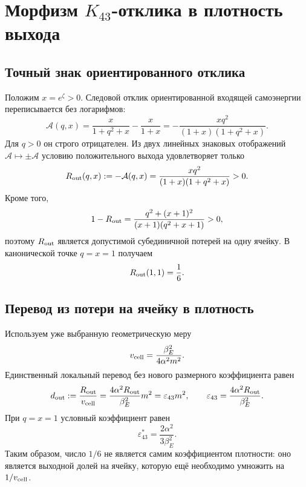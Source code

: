 \chapter{Морфизм \texorpdfstring{$K_{43}$}{K43}-отклика в плотность выхода}
\label{ch:v10-breathing-k43-output-density-morphism}

\section{Точный знак ориентированного отклика}

Положим $x=e^\zeta>0$. Следовой отклик ориентированной входящей
самоэнергии переписывается без логарифмов:
\begin{equation}
 \mathcal A(q,x)
 =\frac{x}{1+q^2+x}-\frac{x}{1+x}
 =-\frac{xq^2}{(1+x)(1+q^2+x)}.
 \label{eq:v10-k43-output-trace-response}
\end{equation}
Для $q>0$ он строго отрицателен. Из двух линейных знаковых отображений
$\mathcal A\mapsto\pm\mathcal A$ условию положительного выхода удовлетворяет
только
\begin{equation}
 R_{\rm out}(q,x):=-\mathcal A(q,x)
 =\frac{xq^2}{(1+x)(1+q^2+x)}>0.
 \label{eq:v10-k43-output-fraction}
\end{equation}
Кроме того,
\begin{equation}
 1-R_{\rm out}
 =\frac{q^2+(x+1)^2}{(x+1)(q^2+x+1)}>0,
 \label{eq:v10-k43-output-subunit}
\end{equation}
поэтому $R_{\rm out}$ является допустимой субединичной потерей на одну
ячейку. В канонической точке $q=x=1$ получаем
\begin{equation}
 R_{\rm out}(1,1)=\frac16.
 \label{eq:v10-k43-output-witness}
\end{equation}

\section{Перевод из потери на ячейку в плотность}

Используем уже выбранную геометрическую меру
\begin{equation}
 v_{\rm cell}=\frac{\beta_E^2}{4\alpha^2m^2}.
\end{equation}
Единственный локальный перевод без нового размерного коэффициента равен
\begin{equation}
 d_{\rm out}
 :=\frac{R_{\rm out}}{v_{\rm cell}}
 =\frac{4\alpha^2R_{\rm out}}{\beta_E^2}m^2
 =\varepsilon_{43}m^2,
 \qquad
 \varepsilon_{43}
 =\frac{4\alpha^2R_{\rm out}}{\beta_E^2}.
 \label{eq:v10-k43-output-density}
\end{equation}
При $q=x=1$ условный коэффициент равен
\begin{equation}
 \varepsilon_{43}^{*}
 =\frac{2\alpha^2}{3\beta_E^2}.
 \label{eq:v10-k43-output-epsilon-witness}
\end{equation}
Таким образом, число $1/6$ не является самим коэффициентом плотности:
оно является выходной долей на ячейку, которую ещё необходимо умножить на
$1/v_{\rm cell}$.

